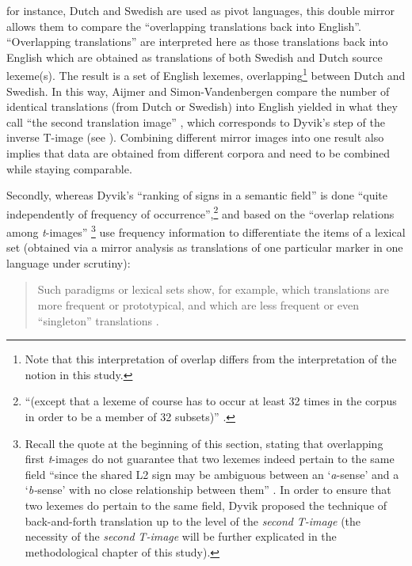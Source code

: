 for instance, Dutch and Swedish are used as pivot languages, this double mirror allows them to compare the “overlapping translations back into English”. “Overlapping translations” are interpreted here as those translations back into English which are obtained as translations of both Swedish and Dutch source lexeme(s). The result is a set of English lexemes, overlapping\footnote{Note that this interpretation of overlap differs from the interpretation of the notion in this study.} between Dutch and Swedish. In this way, Aijmer and Simon-Vandenbergen compare  the number of identical translations (from Dutch or Swedish) into English yielded in what they call “the second translation image” \citep[1796]{aijmer_model_2004}, which corresponds to Dyvik’s step of the inverse T-image (see ). Combining different mirror images into one result also implies that data are obtained from different corpora and need to be combined while staying comparable.

Secondly, whereas Dyvik’s “ranking of signs in a semantic field” is done “quite independently of frequency of occurrence”,\footnote{“(except that a lexeme of course has to occur at least 32 times in the corpus in order to be a member of 32 subsets)” \citep[73]{johansson_translational_1998}.} and based on the “overlap relations among \textit{t}{}-images” \citep[73]{johansson_translational_1998}\footnote{Recall the quote at the beginning of this section, stating that overlapping first \textit{t}{}-images do not guarantee that two lexemes indeed pertain to the same field “since the shared L2 sign may be ambiguous between an ‘\textit{a}{}-sense’ and a ‘\textit{b-}sense’ with no close relationship between them” \citep[72]{johansson_translational_1998}. In order to ensure that two lexemes do pertain to the same field, Dyvik proposed the technique of back-and-forth translation up to the level of the \textit{second} \textit{T-image} (the necessity of the \textit{second} \textit{T-image} will be further explicated in the methodological chapter of this study).} \citet{aijmer_model_2004} use frequency information to differentiate the items of a lexical set (obtained via a mirror analysis as translations of one particular marker in one language under scrutiny): 

\begin{quote}
Such paradigms or lexical sets show, for example, which translations are more frequent or prototypical, and which are less frequent or even ``singleton'' translations \citep[1785--1786]{aijmer_model_2004}.
\end{quote}

